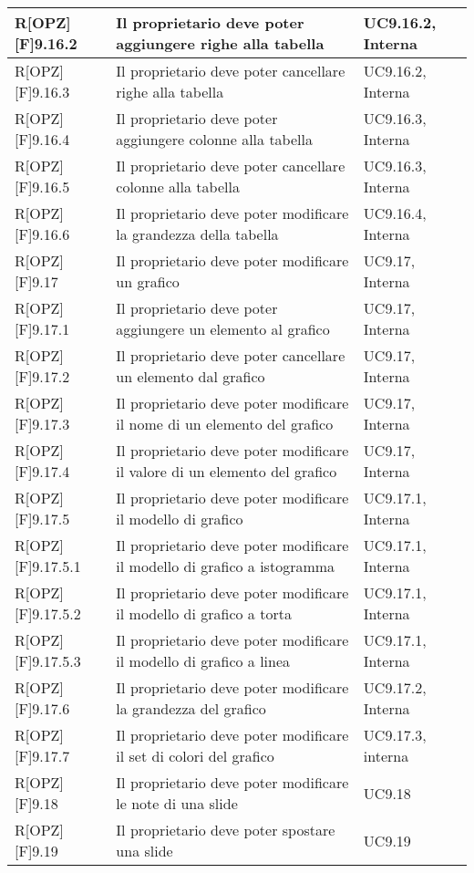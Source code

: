 	\begin{table}[h]
		\begin{tabular}{|p{}|p{}|p{}|}
			\midrule

			R[OPZ][F]9.16.2 & Il proprietario deve poter aggiungere righe alla tabella & UC9.16.2, Interna \\ \midrule
			R[OPZ][F]9.16.3 & Il proprietario deve poter cancellare righe alla tabella & UC9.16.2, Interna \\ \midrule
			R[OPZ][F]9.16.4 & Il proprietario deve poter aggiungere colonne alla tabella & UC9.16.3, Interna \\ \midrule
			R[OPZ][F]9.16.5 & Il proprietario deve poter cancellare colonne alla tabella & UC9.16.3, Interna \\ \midrule
			R[OPZ][F]9.16.6 & Il proprietario deve poter modificare la grandezza della tabella & UC9.16.4, Interna \\ \midrule
			R[OPZ][F]9.17 & Il proprietario deve poter modificare un grafico & UC9.17, Interna \\ \midrule
			R[OPZ][F]9.17.1 & Il proprietario deve poter aggiungere un elemento al grafico & UC9.17, Interna \\ \midrule
			R[OPZ][F]9.17.2 & Il proprietario deve poter cancellare un elemento dal grafico & UC9.17, Interna \\ \midrule
			R[OPZ][F]9.17.3 & Il proprietario deve poter modificare il nome di un elemento del grafico & UC9.17, Interna \\ \midrule
			R[OPZ][F]9.17.4 & Il proprietario deve poter modificare il valore di un elemento del grafico & UC9.17, Interna \\ \midrule
			R[OPZ][F]9.17.5 & Il proprietario deve poter modificare il modello di grafico & UC9.17.1, Interna \\ \midrule
			R[OPZ][F]9.17.5.1 & Il proprietario deve poter modificare il modello di grafico a istogramma & UC9.17.1, Interna \\ \midrule
			R[OPZ][F]9.17.5.2 & Il proprietario deve poter modificare il modello di grafico a torta & UC9.17.1, Interna \\ \midrule
			R[OPZ][F]9.17.5.3 & Il proprietario deve poter modificare il modello di grafico a linea & UC9.17.1, Interna \\ \midrule
			R[OPZ][F]9.17.6 & Il proprietario deve poter modificare la grandezza del grafico & UC9.17.2, Interna \\ \midrule
			R[OPZ][F]9.17.7 & Il proprietario deve poter modificare il set di colori del grafico & UC9.17.3, interna \\ \midrule
			R[OPZ][F]9.18 & Il proprietario deve poter modificare le note di una slide & UC9.18 \\ \midrule
			R[OPZ][F]9.19 & Il proprietario deve poter spostare una slide & UC9.19 \\ \midrule

	\end{tabular}
	\end{table}
	\newpage

